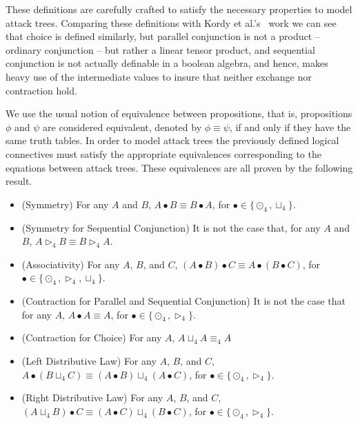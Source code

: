 These definitions are carefully crafted to satisfy the necessary
properties to model attack trees.  Comparing these definitions with
Kordy et al.'s~\cite{Kordy:2012} work we can see that choice is
defined similarly, but parallel conjunction is not a product --
ordinary conjunction -- but rather a linear tensor product, and
sequential conjunction is not actually definable in a boolean algebra,
and hence, makes heavy use of the intermediate values to insure that
neither exchange nor contraction hold.  

We use the usual notion of equivalence between propositions, that is,
propositions $\phi$ and $\psi$ are considered equivalent, denoted by
$\phi \equiv \psi$, if and only if they have the same truth tables. In
order to model attack trees the previously defined logical connectives
must satisfy the appropriate equivalences corresponding to the
equations between attack trees.  These equivalences are all proven by
the following result.
\begin{lemma}
  \label{lemma:props_atree_ops_quaternary-semantics}
  \begin{itemize}
  \item[] (Symmetry) For any $A$ and $B$, $A \bullet B \equiv B \bullet A$, for $\bullet \in \{\odot_4, \sqcup_4\}$.\\[-5px]
  \item[] (Symmetry for Sequential Conjunction) It is not the case that, for any $A$ and $B$, $A \rhd_4 B \equiv B \rhd_4 A$.\\[-5px]
  \item[] (Associativity) For any $A$, $B$, and $C$, $(A \bullet B) \bullet C \equiv A \bullet (B \bullet C)$, for $\bullet \in \{\odot_4, \rhd_4, \sqcup_4\}$.\\[-5px]
  \item[] (Contraction for Parallel and Sequential Conjunction) It is not the case that for any $A$, $A \bullet A \equiv A$, for $\bullet \in \{\odot_4, \rhd_4\}$.\\[-5px]
  \item[] (Contraction for Choice) For any $A$, $A \sqcup_4 A \equiv_4 A$\\[-5px]
  \item[] (Left Distributive Law) For any $A$, $B$, and $C$, $A \bullet (B \sqcup_4 C) \equiv (A \bullet B) \sqcup_4 (A \bullet C)$, for $\bullet \in \{\odot_4, \rhd_4\}$.\\[-5px]
  \item[] (Right Distributive Law) For any $A$, $B$, and $C$, $(A \sqcup_4 B) \bullet C \equiv (A \bullet C) \sqcup_4 (B \bullet C)$, for $\bullet \in \{\odot_4, \rhd_4\}$.\\
  \end{itemize}
\end{lemma}

